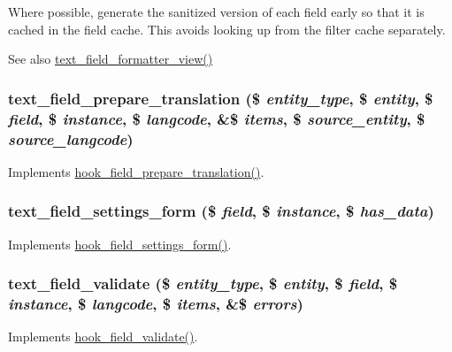 Where possible, generate the sanitized version of each field early so that it is cached in the field cache. This avoids looking up from the filter cache separately.

\begin{DoxySeeAlso}{See also}
\hyperlink{text_8module_afc45ca296fcf7338ae6c3877b4d8b926}{text\_\-field\_\-formatter\_\-view()} 
\end{DoxySeeAlso}
\hypertarget{text_8module_a05f6cb8a18f03ffc50d78563c2e7cba6}{
\subsubsection[{text\_\-field\_\-prepare\_\-translation}]{\setlength{\rightskip}{0pt plus 5cm}text\_\-field\_\-prepare\_\-translation (\$ {\em entity\_\-type}, \/  \$ {\em entity}, \/  \$ {\em field}, \/  \$ {\em instance}, \/  \$ {\em langcode}, \/  \&\$ {\em items}, \/  \$ {\em source\_\-entity}, \/  \$ {\em source\_\-langcode})}}
\label{text_8module_a05f6cb8a18f03ffc50d78563c2e7cba6}
Implements \hyperlink{group__field__types_ga551145e42b305ccf93e325fc590fa379}{hook\_\-field\_\-prepare\_\-translation()}. \hypertarget{text_8module_af4495cfed6f9461e1b83b541e133a61c}{
\subsubsection[{text\_\-field\_\-settings\_\-form}]{\setlength{\rightskip}{0pt plus 5cm}text\_\-field\_\-settings\_\-form (\$ {\em field}, \/  \$ {\em instance}, \/  \$ {\em has\_\-data})}}
\label{text_8module_af4495cfed6f9461e1b83b541e133a61c}
Implements \hyperlink{group__field__types_gab8a2ed808857cc6f3cb661fbc99d30d4}{hook\_\-field\_\-settings\_\-form()}. \hypertarget{text_8module_a0f6c8c7d5aef9765478ae16efeeaec5e}{
\subsubsection[{text\_\-field\_\-validate}]{\setlength{\rightskip}{0pt plus 5cm}text\_\-field\_\-validate (\$ {\em entity\_\-type}, \/  \$ {\em entity}, \/  \$ {\em field}, \/  \$ {\em instance}, \/  \$ {\em langcode}, \/  \$ {\em items}, \/  \&\$ {\em errors})}}
\label{text_8module_a0f6c8c7d5aef9765478ae16efeeaec5e}
Implements \hyperlink{group__field__types_gaa7d8846e8fe3766e1b3435cd50b965be}{hook\_\-field\_\-validate()}.

